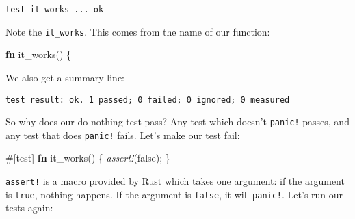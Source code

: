 \documentclass[a4paper,]{book}
\newenvironment{Shaded}{\begin{snugshade}}{\end{snugshade}}
\newcommand{\KeywordTok}[1]{\textcolor[rgb]{0.13,0.29,0.53}{\textbf{{#1}}}}
\newcommand{\ConstantTok}[1]{\textcolor[rgb]{0.00,0.00,0.00}{{#1}}}
\newcommand{\StringTok}[1]{\textcolor[rgb]{0.31,0.60,0.02}{{#1}}}
\newcommand{\PreprocessorTok}[1]{\textcolor[rgb]{0.56,0.35,0.01}{\textit{{#1}}}}
\newcommand{\AttributeTok}[1]{\textcolor[rgb]{0.77,0.63,0.00}{{#1}}}
\newcommand{\NormalTok}[1]{{#1}}
\begin{document}
\begin{verbatim}
test it_works ... ok
\end{verbatim}

Note the \texttt{it\_works}. This comes from the name of our function:

\begin{Shaded}
\begin{Highlighting}[]
\KeywordTok{fn} \NormalTok{it_works() \{}
\end{Highlighting}
\end{Shaded}

We also get a summary line:

\begin{verbatim}
test result: ok. 1 passed; 0 failed; 0 ignored; 0 measured
\end{verbatim}

So why does our do-nothing test pass? Any test which doesn't
\texttt{panic!} passes, and any test that does \texttt{panic!} fails.
Let's make our test fail:

\begin{Shaded}
\begin{Highlighting}[]
\AttributeTok{#[}\NormalTok{test}\AttributeTok{]}
\KeywordTok{fn} \NormalTok{it_works() \{}
    \PreprocessorTok{assert!}\NormalTok{(}\ConstantTok{false}\NormalTok{);}
\NormalTok{\}}
\end{Highlighting}
\end{Shaded}

\texttt{assert!} is a macro provided by Rust which takes one argument:
if the argument is \texttt{true}, nothing happens. If the argument is
\texttt{false}, it will \texttt{panic!}. Let's run our tests again:

\begin{Shaded}
\end{Shaded}
\end{document}

